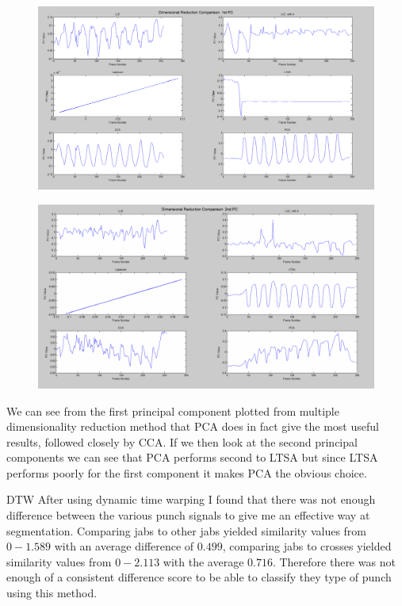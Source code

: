 \begin{figure}[h]
    \centering
    \includegraphics[height=0.25\textheight]{fig04/drcomp.pdf}
    \label{fig:drcomp}
\end{figure}
\begin{figure}[h]
    \centering
    \includegraphics[height=0.25\textheight]{fig04/drcomp2.pdf}
    \label{fig:drcomp}
\end{figure}

We can see from the first principal component plotted from multiple dimensionality reduction method that PCA does in fact give the most useful results, followed closely by CCA. If we then look at the second principal components we can see that PCA performs second to LTSA but since LTSA performs poorly for the first component it makes PCA the obvious choice.


DTW
After using dynamic time warping I found that there was not enough difference between the various punch signals to give me an effective way at segmentation. Comparing jabs to other jabs yielded similarity values from $0 - 1.589$ with an average difference of $0.499$, comparing jabs to crosses yielded similarity values from $0-2.113$ with the average $0.716$. Therefore there was not enough of a consistent difference score to be able to classify they type of punch using this method.

